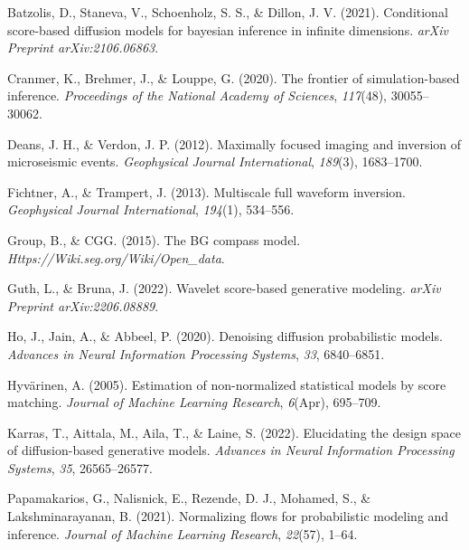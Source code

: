 \documentclass{IMAGE2025}
\begin{document}
\label{refs}
\begin{CSLReferences}{1}{0}
Batzolis, D., Staneva, V., Schoenholz, S. S., \& Dillon, J. V. (2021).
Conditional score-based diffusion models for bayesian inference in
infinite dimensions. \emph{arXiv Preprint arXiv:2106.06863}.

Cranmer, K., Brehmer, J., \& Louppe, G. (2020). The frontier of
simulation-based inference. \emph{Proceedings of the National Academy of
Sciences}, \emph{117}(48), 30055--30062.

Deans, J. H., \& Verdon, J. P. (2012). Maximally focused imaging and
inversion of microseismic events. \emph{Geophysical Journal
International}, \emph{189}(3), 1683--1700.

Fichtner, A., \& Trampert, J. (2013). Multiscale full waveform
inversion. \emph{Geophysical Journal International}, \emph{194}(1),
534--556.

Group, B., \& CGG. (2015). The BG compass model.
\emph{Https://Wiki.seg.org/Wiki/Open\_data}.

Guth, L., \& Bruna, J. (2022). Wavelet score-based generative modeling.
\emph{arXiv Preprint arXiv:2206.08889}.

Ho, J., Jain, A., \& Abbeel, P. (2020). Denoising diffusion
probabilistic models. \emph{Advances in Neural Information Processing
Systems}, \emph{33}, 6840--6851.

Hyvärinen, A. (2005). Estimation of non-normalized statistical models by
score matching. \emph{Journal of Machine Learning Research},
\emph{6}(Apr), 695--709.

Karras, T., Aittala, M., Aila, T., \& Laine, S. (2022). Elucidating the
design space of diffusion-based generative models. \emph{Advances in
Neural Information Processing Systems}, \emph{35}, 26565--26577.

Papamakarios, G., Nalisnick, E., Rezende, D. J., Mohamed, S., \&
Lakshminarayanan, B. (2021). Normalizing flows for probabilistic
modeling and inference. \emph{Journal of Machine Learning Research},
\emph{22}(57), 1--64.


\end{CSLReferences}
\end{document}
